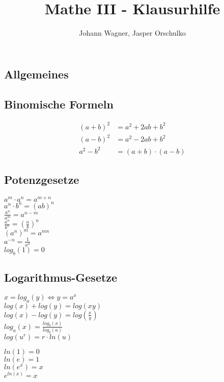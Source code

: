 \documentclass[a4paper, landscape, 10pt]{article}
\author{Johann Wagner, Jasper Orschulko}
\title{Mathe III - Klausurhilfe}
\begin{document}
    \begin{multicols}{5}
        
    
    \begin{small}
    \section{Allgemeines}
	    \subsection{Binomische Formeln}
		    \begin{align*}
		    (a+b)^{2} &= a^{2}+2ab+b^{2}\\
		    (a-b)^{2} &= a^{2}-2ab+b^{2}\\
		    a^{2}-b^{2} &= (a+b)\cdot(a-b)
		    \end{align*}
        \subsection{Potenzgesetze}
            \begin{multicols}{2}
            $a^m \cdot a^n = a^{m+n}$\\
            $a^n \cdot b^n = (ab)^n$\\
            $\frac{a^n}{a^m} = a^{n-m}$\\
            $\frac{a^n}{b^n} = \left(\frac{a}{b}\right)^n$\\
            $(a^n)^m = a^{mn}$\\
            $a^{-n} = \frac{1}{a^n}$\\
            $log_b(1) = 0$
            \end{multicols}
         \subsection{Logarithmus-Gesetze}
            \noindent
            $x = log_a(y) \Leftrightarrow y = a^x$\\
            $log(x) + log(y) = log(xy)$\\
            $log(x) - log(y) = log(\frac{x}{y})$\\
            $log_a(x) = \frac{log_b(x)}{log_b(a)}$  \\
            $log(u^r) = r \cdot ln(u)$
            \begin{multicols}{2}
            \noindent
            $ln(1) = 0$ \\
            $ln(e) = 1$ \\
            $ln(e^x) = x$ \\
            $e^{ln(x)} = x$
            \end{multicols}

\end{small}
\end{multicols}
\end{document}
